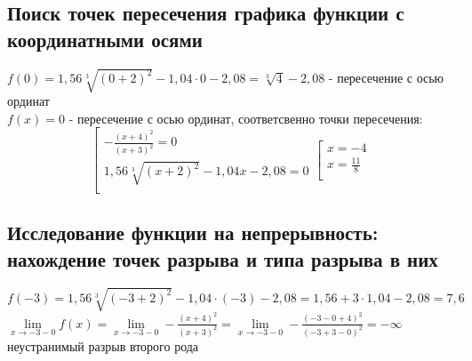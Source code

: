 \documentclass{article}
\begin{document}
    \subsection{Поиск точек пересечения графика функции с координатными осями}
    $f(0) = 1,56 \sqrt[3]{(0+2)^2} - 1,04 \cdot 0 - 2,08 = \sqrt[3]{4} - 2,08$ - пересечение с осью ординат \\
    $f(x) = 0$ - пересечение с осью ординат, соответсвенно точки пересечения: \\
    \begin{equation*}
    \left[ 
      \begin{gathered} 
        - \frac{(x+4)^2}{(x+3)^2} = 0 \\ 
        1,56 \sqrt[3]{(x+2)^2} - 1,04 x - 2,08 = 0 \\
      \end{gathered} 
    \right.
    \left[ 
      \begin{gathered} 
        x = -4 \\ 
        x = \frac{11}{8} \\
      \end{gathered} 
    \right.
    \end{equation*}    

    \subsection{Исследование функции на непрерывность: нахождение точек разрыва и типа разрыва в них}
    $f(-3) = 1,56 \sqrt[3]{(-3+2)^2} - 1,04 \cdot (-3) - 2,08 = 1,56 + 3 \cdot 1,04 - 2,08 = 7,6$ \\
    $\lim\limits_{x \to -3 - 0} f(x) = \lim\limits_{x \to -3 - 0} - \frac{(x+4)^2}{(x+3)^2} = \lim\limits_{x \to -3 - 0} - \frac{(-3-0+4)^2}{(-3+3-0)^2} = - \infty$ \\
    неустранимый разрыв второго рода
\end{document}
